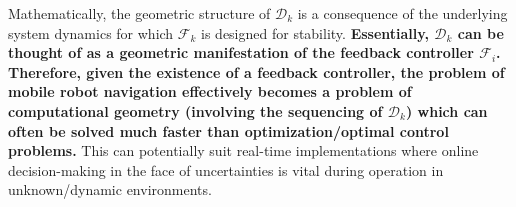 \documentclass{article}
\begin{document}
    \newline 
    \newline Mathematically, the geometric structure of $\mathcal{D}_k$ is a consequence of the underlying system dynamics for which $\mathcal{F}_k$ is designed for stability. \textbf{Essentially, $\mathcal{D}_k$ can be thought of as a geometric manifestation of the feedback controller $\mathcal{F}_i$. Therefore, given the existence of a feedback controller, the problem of mobile robot navigation effectively becomes a problem of computational geometry (involving the sequencing of $\mathcal{D}_k$) which can often be solved much faster than optimization/optimal control problems.} This can potentially suit real-time implementations where online decision-making in the face of uncertainties is vital during operation in unknown/dynamic environments.
    \printbibliography
    
\end{document}
